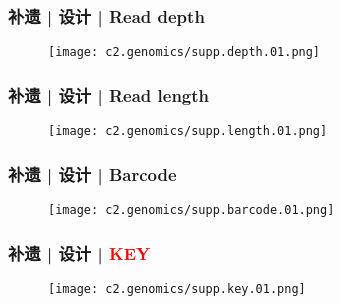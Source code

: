 \begin{frame}
  \frametitle{补遗 | 设计 | Read depth}
  \begin{figure}
    \centering
    \texttt{[image: c2.genomics/supp.depth.01.png]}
  \end{figure}
\end{frame}

\begin{frame}
  \frametitle{补遗 | 设计 | Read length}
  \begin{figure}
    \centering
    \texttt{[image: c2.genomics/supp.length.01.png]}
  \end{figure}
\end{frame}

\begin{frame}
  \frametitle{补遗 | 设计 | Barcode}
  \begin{figure}
    \centering
    \texttt{[image: c2.genomics/supp.barcode.01.png]}
  \end{figure}
\end{frame}

\begin{frame}
  \frametitle{补遗 | 设计 | \textcolor{red}{KEY}}
  \begin{figure}
    \centering
    \texttt{[image: c2.genomics/supp.key.01.png]}
  \end{figure}
\end{frame}

